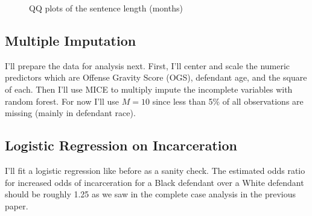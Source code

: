 \documentclass[
  letterpaper,
  DIV=11,
  numbers=noendperiod]{scrartcl}
\begin{document}
\begin{figure}

\begin{minipage}[t]{0.50\linewidth}

{\centering 


}

\end{minipage}%
%
\begin{minipage}[t]{0.50\linewidth}

{\centering 


}

\end{minipage}%

\caption{\label{fig-sen-len-qq}QQ plots of the sentence length (months)}

\end{figure}

\hypertarget{multiple-imputation}{%
\subsection{Multiple Imputation}\label{multiple-imputation}}

I'll prepare the data for analysis next. First, I'll center and scale
the numeric predictors which are Offense Gravity Score (OGS), defendant
age, and the square of each. Then I'll use MICE to multiply impute the
incomplete variables with random forest. For now I'll use \(M = 10\)
since less than 5\% of all observations are missing (mainly in defendant
race).

\hypertarget{logistic-regression-on-incarceration}{%
\subsection{Logistic Regression on
Incarceration}\label{logistic-regression-on-incarceration}}

I'll fit a logistic regression like before as a sanity check. The
estimated odds ratio for increased odds of incarceration for a Black
defendant over a White defendant should be roughly 1.25 as we saw in the
complete case analysis in the previous paper.
\end{document}
